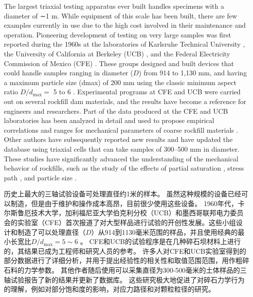 \begin{ParaColumn}
    The largest triaxial testing apparatus ever built handles specimens with a diameter of ∼1 m. While equipment of this scale has been built, there are few examples currently in use due to the high cost involved in their maintenance and operation. Pioneering development of testing on very large samples was first reported during the 1960s at the laboratories of Karlsruhe Technical University \citep{Leussink1960}, the University of California at Berkeley (UCB) \citep{Marachi1969}, and the Federal Electricity Commission of Mexico (CFE) \citep{Marsal1965}. These groups designed and built devices that could handle samples ranging in diameter ($D$) from 914 to 1,130 mm, and having a maximum particle size (dmax) of 200 mm using the classic minimum aspect ratio $D/d_{\max}=$ 5 to 6 \citep{Holtz19561}. Experimental programs at CFE and UCB were carried out on several rockfill dam materials, and the results have become a reference for engineers and researchers. Part of the data produced at the CFE and UCB laboratories has been analyzed in detail and used to propose empirical correlations and ranges for mechanical parameters of coarse rockfill materials \citep{Leps19701159,Barton1981873,Hunter2003909}. Other authors have subsequently reported new results and have updated the database \citep{Charles1980353,Al-Hussaini1983706,Matsuoka1998275,Hunter2003909,Varadarajan2003206,Xiao2014a,Xiao2014b} using triaxial cells that can take samples of 300–500 mm in diameter. These studies have significantly advanced the understanding of the mechanical behavior of rockfills, such as the study of the effects of partial saturation \citep{Oldecop2003289,Alonso2016455}, stress path \citep{Chávez2003215,Xiao2016}, and particle size \citep{Verdugo2007243,Hu2011,Ovalle20201}.

    \switchcolumn

    历史上最大的三轴试验设备可处理直径约1米的样本。 虽然这种规模的设备已经可以制造，但是由于维护和操作成本高昂，目前很少使用这些设备。  1960年代，卡尔斯鲁厄技术大学\citep{Leussink1960}，加利福尼亚大学伯克利分校（UCB）\citep{Marachi1969}和墨西哥联邦电力委员会的实验室（CFE）\citep{Marsal1965}首次报道了对大型样品进行试验的开创性发展。这些小组设计和制造了可以处理直径（$D$）从914到1130毫米范围的样品，并且使用经典的最小长宽比$D/d_{\max}=5\sim 6$ \citep{Holtz19561}。 CFE和UCB的试验程序是在几种碎石坝材料上进行的，其结果已成为工程师和研究人员的参考。 许多人对CFE和UCB实验室得到的部分数据进行了详细分析，并用于提出经验性的相关性和取值范围范围，用作粗碎石料的力学参数\citep{Leps19701159,Barton1981873,Hunter2003909}。 其他作者随后使用可以采集直径为300-500毫米的土体样品的三轴试验报告了新的结果并更新了数据库\citep{Charles1980353,Al-Hussaini1983706,Matsuoka1998275,Hunter2003909,Varadarajan2003206,Xiao2014a,Xiao2014b}。 这些研究极大地促进了对碎石力学行为的理解，例如对部分饱和度的影响\citep{Oldecop2003289,Alonso2016455}，对应力路径\citep{Chávez2003215,Xiao2016}和对颗粒粒径\citep{Verdugo2007243,Hu2011,Ovalle20201}的研究。


\end{ParaColumn}
